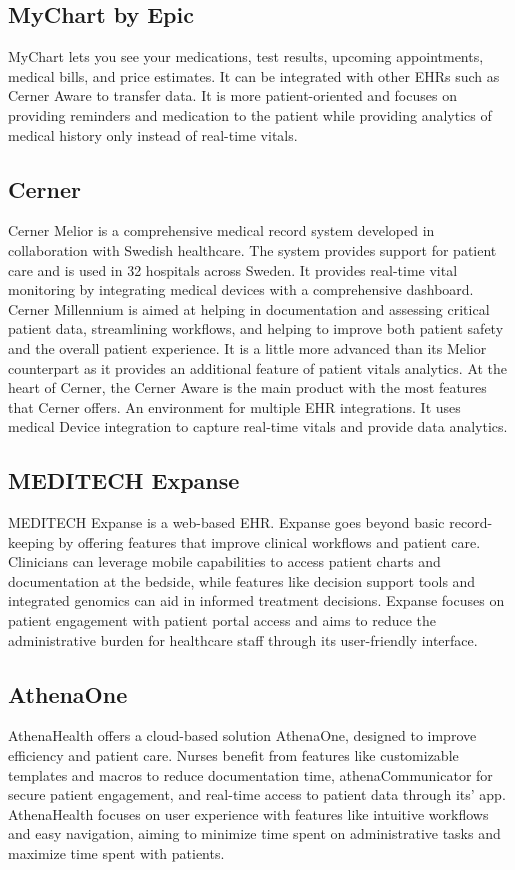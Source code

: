 \subsection{MyChart by Epic}
MyChart lets you see your medications, test results, upcoming appointments, medical bills, and price estimates. It can be integrated with other EHRs such as Cerner Aware to transfer data. It is more patient-oriented and focuses on providing reminders and medication to the patient while providing analytics of medical history only instead of real-time vitals.
\subsection{Cerner}
Cerner Melior is a comprehensive medical record system developed in collaboration with Swedish healthcare. The system provides support for patient care and is used in 32 hospitals across Sweden. It provides real-time vital monitoring by integrating medical devices with a comprehensive dashboard.
Cerner Millennium is aimed at helping in documentation and assessing critical patient data, streamlining workflows, and helping to improve both patient safety and the overall patient experience. It is a little more advanced than its Melior counterpart as it provides an additional feature of patient vitals analytics.
At the heart of Cerner, the Cerner Aware is the main product with the most features that Cerner offers. An environment for multiple EHR integrations. It uses medical Device integration to capture real-time vitals and provide data analytics.
\subsection{MEDITECH Expanse}
MEDITECH Expanse is a web-based EHR. Expanse goes beyond basic record-keeping by offering features that improve clinical workflows and patient care.  Clinicians can leverage mobile capabilities to access patient charts and documentation at the bedside, while features like decision support tools and integrated genomics can aid in informed treatment decisions.  Expanse focuses on patient engagement with patient portal access and aims to reduce the administrative burden for healthcare staff through its user-friendly interface.
\subsection{AthenaOne}
AthenaHealth offers a cloud-based solution AthenaOne, designed to improve efficiency and patient care.  Nurses benefit from features like customizable templates and macros to reduce documentation time, athenaCommunicator for secure patient engagement, and real-time access to patient data through its' app.  AthenaHealth focuses on user experience with features like intuitive workflows and easy navigation, aiming to minimize time spent on administrative tasks and maximize time spent with patients.

